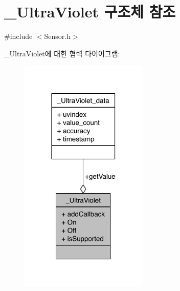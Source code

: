 \hypertarget{struct___ultra_violet}{\section{\-\_\-\-Ultra\-Violet 구조체 참조}
\label{struct___ultra_violet}
}


{\ttfamily \#include $<$Sensor.\-h$>$}



\-\_\-\-Ultra\-Violet에 대한 협력 다이어그램\-:
\nopagebreak
\begin{figure}[H]
\begin{center}
\leavevmode
\includegraphics[width=173pt]{de/df2/struct___ultra_violet__coll__graph}
\end{center}
\end{figure}
